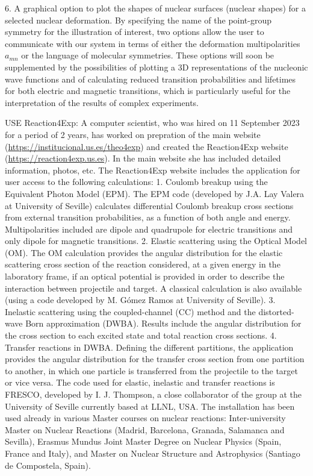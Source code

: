 6. A graphical option to plot the shapes of nuclear surfaces (nuclear shapes) for a selected nuclear deformation.  By specifying the name of the point-group symmetry for the illustration of interest, two options allow the user to communicate with our system in terms of either the deformation multipolarities {$a_{mn}$} or the language of molecular symmetries.
These options will soon be supplemented by the possibilities of plotting a 3D representations of the nucleonic wave functions and of calculating reduced transition probabilities and lifetimes for both electric and magnetic transitions, which is particularly useful for the interpretation of the results of complex experiments. 

USE Reaction4Exp: A computer scientist, who was hired on 11 September 2023 for a period of 2 years, has worked on prepration of the main website (\url{https://institucional.us.es/theo4exp}) and  created the Reaction4Exp website (\url{https://reaction4exp.us.es}). In the main website she has included detailed information, photos, etc. The Reaction4Exp website includes the application for user access to the following calculations:
1. Coulomb breakup using the Equivalent Photon Model (EPM). The EPM code (developed by J.A. Lay Valera at University of Seville) calculates differential Coulomb breakup cross sections from external transition probabilities, as a function of both angle and energy. Multipolarities included are dipole and quadrupole for electric transitions and only dipole for magnetic transitions.
2. Elastic scattering using the Optical Model (OM). The OM calculation provides the angular distribution for the elastic scattering cross section of the reaction considered, at a given energy in the laboratory frame, if an optical potential is provided in order to describe the interaction between projectile and target. A classical calculation is also available (using a code developed by M. Gómez Ramos at University of Seville).
3. Inelastic scattering using the coupled-channel (CC) method and the distorted-wave Born approximation (DWBA). Results include the angular distribution for the cross section to each excited state and total reaction cross sections. 
4. Transfer reactions in DWBA. Defining the different partitions, the application provides the angular distribution for the transfer cross section from one partition to another, in which one particle is transferred from the projectile to the target or vice versa.
The code used for elastic, inelastic and transfer reactions is FRESCO, developed by I. J. Thompson, a close collaborator of the group at the University of Seville currently based at LLNL, USA.
The installation has been used already in various Master courses on nuclear reactions: Inter-university Master on Nuclear Reactions (Madrid, Barcelona, Granada, Salamanca and Sevilla), Erasmus Mundus Joint Master Degree on Nuclear Physics (Spain, France and Italy), and Master on Nuclear Structure and Astrophysics (Santiago de Compostela, Spain).

